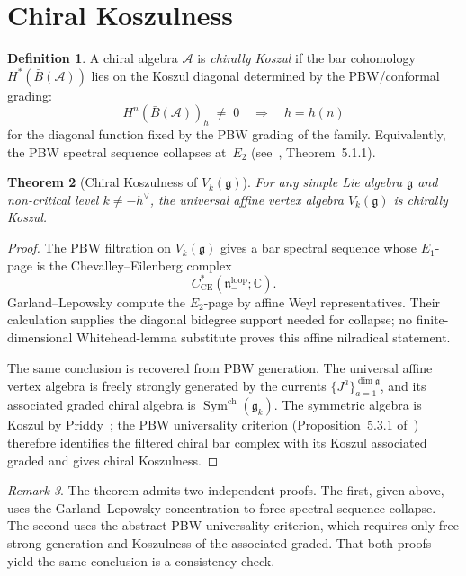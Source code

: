 \documentclass[11pt]{article}
\theoremstyle{plain}
\newtheorem{theorem}{Theorem}[section]
\theoremstyle{definition}
\newtheorem{definition}[theorem]{Definition}
\theoremstyle{remark}
\newtheorem{remark}[theorem]{Remark}
\newcommand{\fg}{\mathfrak{g}}
\newcommand{\fn}{\mathfrak{n}}
\newcommand{\barB}{\bar{B}}
\newcommand{\CE}{\mathrm{CE}}
\DeclareMathOperator{\Sym}{Sym}
\numberwithin{equation}{section}
\begin{document}
\section{Chiral Koszulness}\label{sec:koszulness}

\begin{definition}\label{def:chiral-koszul}
A chiral algebra $\mathcal{A}$ is \emph{chirally Koszul}
if the bar cohomology $H^*(\barB(\mathcal{A}))$ lies on the
Koszul diagonal determined by the PBW/conformal grading:
\begin{equation}
H^n(\barB(\mathcal{A}))_h \;\neq\; 0
\quad \Longrightarrow \quad h=h(n)
\end{equation}
for the diagonal function fixed by the PBW grading of the family.
Equivalently, the PBW spectral sequence collapses at~$E_2$
\textup{(}see~\cite{Lor-MKD}, Theorem~5.1.1\textup{)}.
\end{definition}

\begin{theorem}[Chiral Koszulness of $V_k(\fg)$]
\label{thm:chiral-koszul-km}
For any simple Lie algebra $\fg$ and non-critical level
$k \neq -h^\vee$, the universal affine vertex algebra
$V_k(\fg)$ is chirally Koszul.
\end{theorem}

\begin{proof}
The PBW filtration on \(V_k(\fg)\) gives a bar spectral sequence whose
\(E_1\)-page is the Chevalley--Eilenberg complex
\[
  C^*_{\CE}(\fn_-^{\mathrm{loop}};\mathbb C).
\]
Garland--Lepowsky compute the \(E_2\)-page by affine Weyl
representatives. Their calculation supplies the diagonal bidegree
support needed for collapse; no finite-dimensional Whitehead-lemma
substitute proves this affine nilradical statement.

The same conclusion is recovered from PBW generation. The universal
affine vertex algebra is freely strongly generated by the currents
\(\{J^a\}_{a=1}^{\dim\fg}\), and its associated graded chiral algebra
is \(\Sym^{\mathrm{ch}}(\fg_k)\). The symmetric algebra is Koszul by
Priddy~\cite{Priddy70}; the PBW universality criterion
(Proposition~5.3.1 of~\cite{Lor-MKD}) therefore identifies the
filtered chiral bar complex with its Koszul associated graded and
gives chiral Koszulness.
\end{proof}

\begin{remark}\label{rem:two-proofs}
The theorem admits two independent proofs. The first,
given above, uses the Garland--Lepowsky concentration to
force spectral sequence collapse. The second uses the
abstract PBW universality criterion, which requires only
free strong generation and Koszulness of the associated
graded. That both proofs yield the same conclusion is a
consistency check.
\end{remark}
\end{document}
